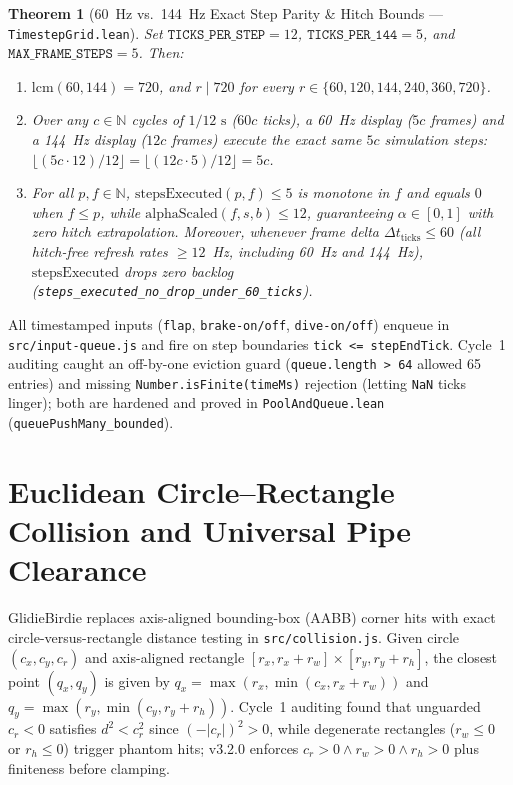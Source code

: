 \documentclass[11pt,letterpaper]{article}
\newtheorem{theorem}{Theorem}
\theoremstyle{remark}
\begin{document}
\begin{theorem}[60~Hz vs.\ 144~Hz Exact Step Parity \& Hitch Bounds --- \texttt{TimestepGrid.lean}]
\label{thm:timestep}
Set $\texttt{TICKS\_PER\_STEP} = 12$, $\texttt{TICKS\_PER\_144} = 5$, and $\texttt{MAX\_FRAME\_STEPS} = 5$. Then:
\begin{enumerate}[leftmargin=1.8em, itemsep=1pt]
  \item $\mathrm{lcm}(60, 144) = 720$, and $r \mid 720$ for every $r \in \{60, 120, 144, 240, 360, 720\}$.
  \item Over any $c \in \mathbb{N}$ cycles of $1/12\text{ s}$ ($60c$ ticks), a 60~Hz display ($5c$ frames) and a 144~Hz display ($12c$ frames) execute the exact same $5c$ simulation steps: $\lfloor (5c \cdot 12)/12 \rfloor = \lfloor (12c \cdot 5)/12 \rfloor = 5c$.
  \item For all $p, f \in \mathbb{N}$, $\mathrm{stepsExecuted}(p, f) \le 5$ is monotone in $f$ and equals $0$ when $f \le p$, while $\mathrm{alphaScaled}(f, s, b) \le 12$, guaranteeing $\alpha \in [0, 1]$ with zero hitch extrapolation. Moreover, whenever frame delta $\Delta t_{\text{ticks}} \le 60$ (all hitch-free refresh rates $\ge 12$~Hz, including 60~Hz and 144~Hz), $\mathrm{stepsExecuted}$ drops zero backlog (\texttt{steps\_executed\_no\_drop\_under\_60\_ticks}).
\end{enumerate}
\end{theorem}

All timestamped inputs (\texttt{flap}, \texttt{brake-on/off}, \texttt{dive-on/off}) enqueue in \texttt{src/input-queue.js} and fire on step boundaries \texttt{tick <= stepEndTick}. Cycle~1 auditing caught an off-by-one eviction guard (\texttt{queue.length > 64} allowed 65 entries) and missing \texttt{Number.\allowbreak isFinite(\allowbreak timeMs)} rejection (letting \texttt{NaN} ticks linger); both are hardened and proved in \texttt{PoolAndQueue.lean} (\texttt{queuePushMany\_\allowbreak bounded}).

\section{Euclidean Circle--Rectangle Collision and Universal Pipe Clearance}
\label{sec:collision}

GlidieBirdie replaces axis-aligned bounding-box (AABB) corner hits with exact circle-versus-rectangle distance testing \cite{ericson2004} in \texttt{src/collision.js}. Given circle $(c_x, c_y, c_r)$ and axis-aligned rectangle $[r_x, r_x+r_w] \times [r_y, r_y+r_h]$, the closest point $(q_x, q_y)$ is given by $q_x = \max(r_x, \min(c_x, r_x+r_w))$ and $q_y = \max(r_y, \min(c_y, r_y+r_h))$. Cycle~1 auditing found that unguarded $c_r < 0$ satisfies $d^2 < c_r^2$ since $(-|c_r|)^2 > 0$, while degenerate rectangles ($r_w \le 0$ or $r_h \le 0$) trigger phantom hits; v3.2.0 enforces $c_r > 0 \wedge r_w > 0 \wedge r_h > 0$ plus finiteness before clamping.
\end{document}
